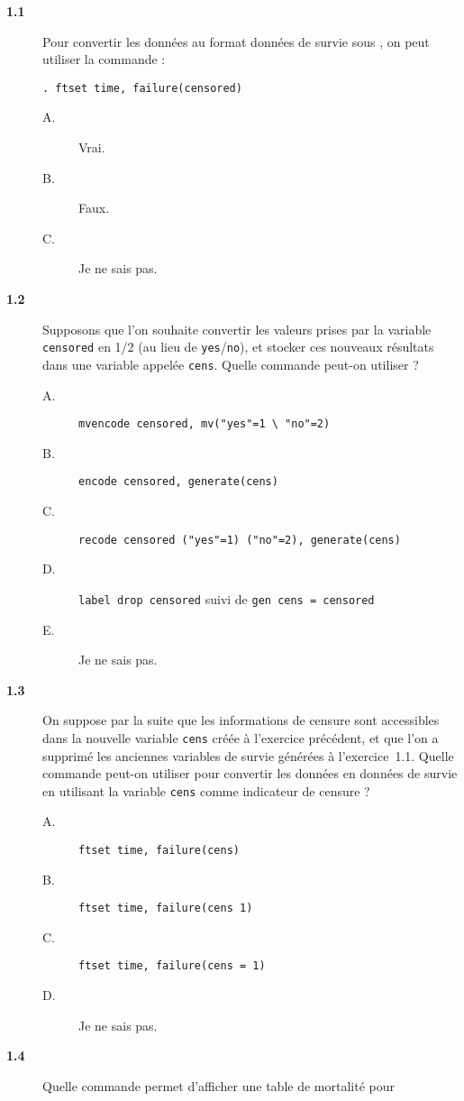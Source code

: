 \begin{description}
\item[\bf 1.1] Pour convertir les données au format données de survie sous
  \Stata, on peut utiliser la commande : 
\begin{verbatim}
. ftset time, failure(censored)
\end{verbatim}
\begin{description}
\item[A.] Vrai.
\item[B.] Faux.
\item[C.] Je ne sais pas.
\end{description}
\item[\bf 1.2] Supposons que l'on souhaite convertir les valeurs prises par
  la variable \texttt{censored} en 1/2 (au lieu de
  \texttt{yes}/\texttt{no}), et stocker ces nouveaux résultats dans une
  variable appelée \texttt{cens}. Quelle commande peut-on utiliser ?
\begin{description}
\item[A.] \verb|mvencode censored, mv("yes"=1 \ "no"=2)|
\item[B.] \verb|encode censored, generate(cens)|
\item[C.] \verb|recode censored ("yes"=1) ("no"=2), generate(cens)|
\item[D.] \verb|label drop censored| suivi de \verb|gen cens = censored|
\item[E.] Je ne sais pas.
\end{description}
\item[\bf 1.3] On suppose par la suite que les informations de censure sont
  accessibles dans la nouvelle variable \texttt{cens} créée à l'exercice
  précédent, et que l'on a supprimé les anciennes variables de survie
  générées à l'exercice~1.1. Quelle commande peut-on utiliser pour convertir
  les données en données de survie en utilisant la variable \texttt{cens}
  comme indicateur de censure ?  
\begin{description}
\item[A.] \verb|ftset time, failure(cens)|
\item[B.] \verb|ftset time, failure(cens 1)|
\item[C.] \verb|ftset time, failure(cens = 1)|
\item[D.] Je ne sais pas.
\end{description}
\item[\bf 1.4] Quelle commande permet d'afficher une table de mortalité pour

\end{description}
